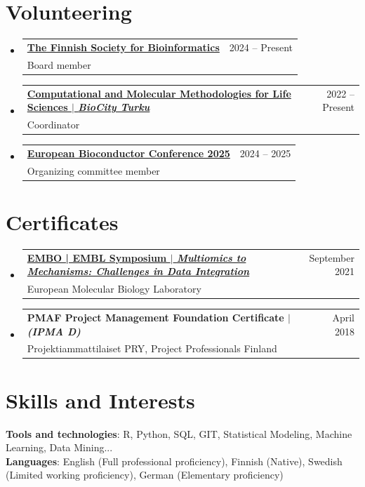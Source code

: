 \documentclass[A4,10pt]{article}
\makeatletter
\newcommand{\CVSubheading}[4]{
	\vspace{-2pt}\item
	\begin{tabular*}{0.97\textwidth}[t]{l@{\extracolsep{\fill}}r}
		\textbf{#1} & #2 \\
		\small#3 & \small #4 \\
	\end{tabular*}\vspace{-7pt}
}
\newcommand{\CVSubHeadingListStart}{\begin{itemize}[leftmargin=0.5cm, label={}]}
\newcommand{\CVSubHeadingListEnd}{\end{itemize}}
\makeatother
\begin{document}
	\section{Volunteering}
	\CVSubHeadingListStart
	\CVSubheading
	{\href{https://www.bioinf.fi/}{The Finnish Society for Bioinformatics}}{2024 -- Present}
	{Board member}{}
	\CVSubheading
	{\href{https://biocityturku.fi/research-programs/complifesci/}{Computational and Molecular Methodologies for Life Sciences $|$ \emph{\small{BioCity Turku}}}}{2022 -- Present}
	{Coordinator}{}
	\CVSubheading
	{\href{http://eurobioc2025.bioconductor.org/}{European Bioconductor Conference 2025}}{2024 -- 2025}
	{Organizing committee member}{}
	\CVSubHeadingListEnd
	
	\section{Certificates}
	\CVSubHeadingListStart
	\CVSubheading
	{\href{https://emea-interface.ungerboeck.com/clients/EMBL/Prod/LinkedInCertificates/cert/147764_6070.pdf}{EMBO | EMBL Symposium $|$ \emph{\small{Multiomics to Mechanisms: Challenges in Data Integration}}}}{September 2021}
	{European Molecular Biology Laboratory}{}
	\CVSubheading
	{PMAF Project Management Foundation Certificate $|$ \emph{\small{(IPMA D)}}}{April 2018}
	{Projektiammattilaiset PRY, Project Professionals Finland}{}
	\CVSubHeadingListEnd

	\section{Skills and Interests}
	\begin{itemize}[leftmargin=0.5cm, label={}]
		\small{\item{
				\textbf{Tools and technologies}{: R, Python, SQL, GIT, Statistical Modeling, Machine Learning, Data Mining...} \\
				\textbf{Languages}{: English (Full professional proficiency), Finnish (Native), Swedish (Limited working proficiency), German (Elementary proficiency)} \\		
		}}
	\end{itemize}
\end{document}
